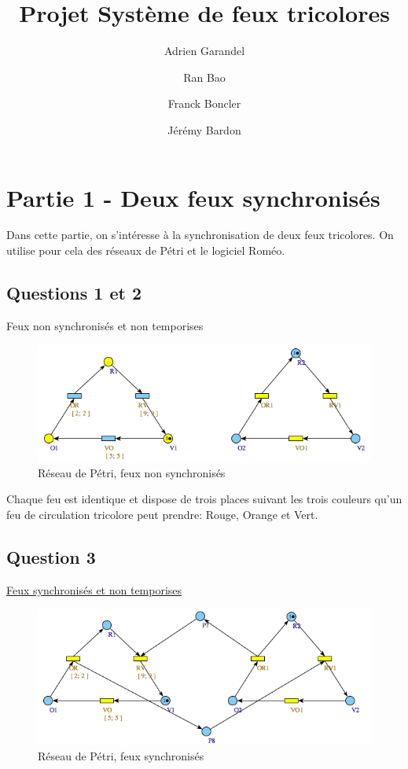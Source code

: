\documentclass[11pt]{article}
\title{Projet Système de feux tricolores}
\author{Adrien Garandel \and Ran Bao \and Franck Boncler \and Jérémy Bardon}
\begin{document}
\maketitle
\tableofcontents
\newpage

\section{Partie 1 - Deux feux synchronisés}
Dans cette partie, on s'intéresse à la synchronisation de deux feux tricolores. On utilise pour cela des réseaux de Pétri et le logiciel Roméo.

\subsection{Questions 1 et 2}
Feux non synchronisés et non temporises

\begin{figure}[H]
	\centering
	\includegraphics[scale=0.5]{ressources/part1/Q2.png}
	\caption{Réseau de Pétri, feux non synchronisés}
\end{figure}

Chaque feu est identique et dispose de trois places suivant les trois couleurs qu'un feu de circulation tricolore peut prendre: Rouge, Orange et Vert.

\subsection{Question 3}

\href{https://github.com/masters-info-nantes/hong-cheng-lv/blob/master/ressources/part1/Q3-FeuxSynchro.xml}{Feux
synchronisés et non temporises}

\begin{figure}[H]
	\centering
	\includegraphics[scale=0.5]{ressources/part1/Q3.png}
	\caption{Réseau de Pétri, feux synchronisés}
\end{figure}
\end{document}
